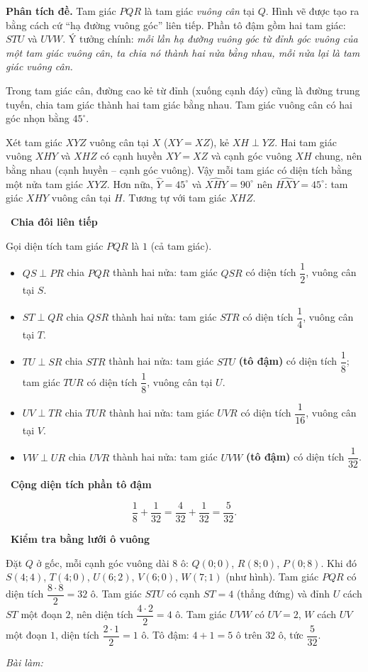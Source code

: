 \documentclass[11pt]{article}
\newif\ifsol \solfalse
\newcommand{\StuProb}[2]{\begin{probboxS}{#1}{#2}\StuProbBody\end{probboxS}}
\newcommand{\probsol}[1]{%
  \begin{lrbox}{\solmeasure}\begin{minipage}{\dimexpr\linewidth-24pt\relax}#1\end{minipage}\end{lrbox}%
  \ifsol
    \begin{solbox}#1\end{solbox}%
  \else
    \setlength{\solht}{\dimexpr\ht\solmeasure+\dp\solmeasure+0.85cm\relax}%
    \ifdim\solht<1.35cm\setlength{\solht}{1.35cm}\fi
    \ifdim\solht>\StudentMaxWork\setlength{\solht}{\StudentMaxWork}\fi
    \par\noindent\begin{minipage}{\linewidth}%
    \expandafter\StuProb\StuProbArgs
    \begin{tcolorbox}[colback=white,colframe=Line,boxrule=0.8pt,arc=5pt,
      left=8pt,right=8pt,top=4pt,bottom=4pt,height=\solht]{\footnotesize\color{Slate}\itshape\WorkWord}\end{tcolorbox}%
    \end{minipage}\par\medskip
  \fi}
\newlength{\StudentMaxWork}\setlength{\StudentMaxWork}{4.5cm}
\newcommand{\step}[2]{\par\smallskip\noindent{\bfseries\color{tmBlue!85!black}\StepWord~#1.}\ {\bfseries #2}\par\nopagebreak}
\def\WorkWord{Bài làm:}
\def\StepWord{Bước}
\begin{document}
\probsol{
\textbf{Phân tích đề.} Tam giác $PQR$ là tam giác \emph{vuông cân} tại $Q$. Hình vẽ được tạo ra bằng cách cứ ``hạ đường vuông góc'' liên tiếp. Phần tô đậm gồm hai tam giác: $STU$ và $UVW$. Ý tưởng chính: \emph{mỗi lần hạ đường vuông góc từ đỉnh góc vuông của một tam giác vuông cân, ta chia nó thành hai nửa bằng nhau, mỗi nửa lại là tam giác vuông cân.}

\begin{recallbox}Trong tam giác cân, đường cao kẻ từ đỉnh (xuống cạnh đáy) cũng là đường trung tuyến, chia tam giác thành hai tam giác bằng nhau. Tam giác vuông cân có hai góc nhọn bằng $45^\circ$.\end{recallbox}

\begin{proofbox}Xét tam giác $XYZ$ vuông cân tại $X$ ($XY=XZ$), kẻ $XH\perp YZ$. Hai tam giác vuông $XHY$ và $XHZ$ có cạnh huyền $XY=XZ$ và cạnh góc vuông $XH$ chung, nên bằng nhau (cạnh huyền -- cạnh góc vuông). Vậy mỗi tam giác có diện tích bằng một nửa tam giác $XYZ$. Hơn nữa, $\widehat{Y}=45^\circ$ và $\widehat{XHY}=90^\circ$ nên $\widehat{HXY}=45^\circ$: tam giác $XHY$ vuông cân tại $H$. Tương tự với tam giác $XHZ$.\end{proofbox}

\step{1}{Chia đôi liên tiếp}
Gọi diện tích tam giác $PQR$ là $1$ (cả tam giác).
\begin{itemize}[leftmargin=1.4em,itemsep=1pt]
\item $QS\perp PR$ chia $PQR$ thành hai nửa: tam giác $QSR$ có diện tích $\dfrac12$, vuông cân tại $S$.
\item $ST\perp QR$ chia $QSR$ thành hai nửa: tam giác $STR$ có diện tích $\dfrac14$, vuông cân tại $T$.
\item $TU\perp SR$ chia $STR$ thành hai nửa: tam giác $STU$ \textbf{(tô đậm)} có diện tích $\dfrac18$; tam giác $TUR$ có diện tích $\dfrac18$, vuông cân tại $U$.
\item $UV\perp TR$ chia $TUR$ thành hai nửa: tam giác $UVR$ có diện tích $\dfrac1{16}$, vuông cân tại $V$.
\item $VW\perp UR$ chia $UVR$ thành hai nửa: tam giác $UVW$ \textbf{(tô đậm)} có diện tích $\dfrac1{32}$.
\end{itemize}

\step{2}{Cộng diện tích phần tô đậm}
\[\frac18+\frac1{32}=\frac{4}{32}+\frac{1}{32}=\frac{5}{32}.\]

\step{3}{Kiểm tra bằng lưới ô vuông}
Đặt $Q$ ở gốc, mỗi cạnh góc vuông dài $8$ ô: $Q(0;0)$, $R(8;0)$, $P(0;8)$. Khi đó $S(4;4)$, $T(4;0)$, $U(6;2)$, $V(6;0)$, $W(7;1)$ (như hình). Tam giác $PQR$ có diện tích $\dfrac{8\cdot 8}{2}=32$ ô. Tam giác $STU$ có cạnh $ST=4$ (thẳng đứng) và đỉnh $U$ cách $ST$ một đoạn $2$, nên diện tích $\dfrac{4\cdot 2}{2}=4$ ô. Tam giác $UVW$ có $UV=2$, $W$ cách $UV$ một đoạn $1$, diện tích $\dfrac{2\cdot1}{2}=1$ ô. Tô đậm: $4+1=5$ ô trên $32$ ô, tức $\dfrac5{32}$.

}
\end{document}

